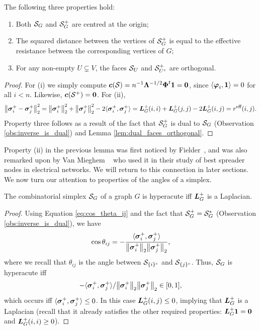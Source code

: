 \begin{lemma}
	\label{lem:S_G_basic_properties}
	The following three properties hold: 
	\begin{enumerate}
		\item 	Both $\mathcal{S}_G$ and $\mathcal{S}_G^+$ are centred at the origin;
		\item The squared distance between the vertices of $\mathcal{S}_G^+$ is equal to the effective resistance between the corresponding vertices of $G$; 
		\item For any non-empty $U\subsetneq V$, the faces $\mathcal{S}_U$ and $\mathcal{S}^+_{U^c}$ are orthogonal. 
	\end{enumerate}
\end{lemma}
\begin{proof}
	For (i) we  simply compute $\vb*{c}(\mathcal{S}) = n^{-1}\vb{\Lambda}^{-1/2}\boldsymbol{\Phi}^t \vb{1} =\vb{0}$, since $\langle \vb*{\varphi}_i,\vb{1}\rangle =0$ for all $i<n$.  Likewise, $\vb*{c}(\mathcal{S}^+)=\vb{0}$. For (ii), 
	\begin{equation*}
	\norm{\vb*{\sigma}_i^+-\vb*{\sigma}_j^+}_2^2 = \norm{\vb*{\sigma}_i^+}_2^2 + \norm{\vb*{\sigma}_j^+}_2^2 - 2\langle \vb*{\sigma}_i^+,\vb*{\sigma}_j^+\rangle = \vb*{L}_G^+(i,i) + \vb*{L}_G^+(j,j) - 2\vb*{L}_G^+(i,j) = r^{\text{eff}}(i,j).
	\end{equation*}
	Property three follows as a result of the fact that $\mathcal{S}_G^+$ is dual to $\mathcal{S}_G$ (Observation \ref{obs:inverse_is_dual}) and Lemma \ref{lem:dual_faces_orthogonal}. 
\end{proof}




Property (ii) in the previous lemma was first noticed by Fielder~\cite[Chapter 6]{fiedler2011matrices}, and was also remarked upon by Van Mieghem \etal~\cite{van2017pseudoinverse} who used it in their study of best spreader nodes in electrical networks. We will return to this connection in later sections. We now turn our attention to properties of the angles of a simplex.  

\begin{lemma}
	The combinatorial simplex $\mathcal{S}_G$ of a graph $G$ is hyperacute iff $\vb*{L}_G^+$ is a Laplacian.
\end{lemma}
\begin{proof}
	Using Equation \ref{eq:cos_theta_ij} and the fact that $\mathcal{S}_G^+=\mathcal{S}_G^*$ (Observation \ref{obs:inverse_is_dual}), we have
	\[\cos \theta_{ij} = -\frac{\langle \vb*{\sigma}_i^+,\vb*{\sigma}_j^+\rangle }{\norm{\vb*{\sigma}_i^+}_2 \norm{\vb*{\sigma}_j^+}_2},\]
	where we recall that $\theta_{ij}$ is the angle between $\mathcal{S}_{\{i\}^c}$ and $\mathcal{S}_{\{j\}^c}$. Thus, $\mathcal{S}_G$ is hyperacute iff
	 \[-\langle \vb*{\sigma}_i^+,\vb*{\sigma}_j^+\rangle\\/\norm{\vb*{\sigma}_i^+}_2 \norm{\vb*{\sigma}_j^+}_2 \in[0,1],\] which occurs iff $\langle \vb*{\sigma}_i^+,\vb*{\sigma}_j^+\rangle \leq 0$. In this case $\vb*{L}_G^+(i,j)\leq 0$, implying that $\vb*{L}_G^+$ is a Laplacian (recall that it already satisfies the other required properties: $\vb*{L}_G^+\vb{1}=\vb{0}$ and $\vb*{L}_G^+(i,i)\geq 0$). 
\end{proof}

